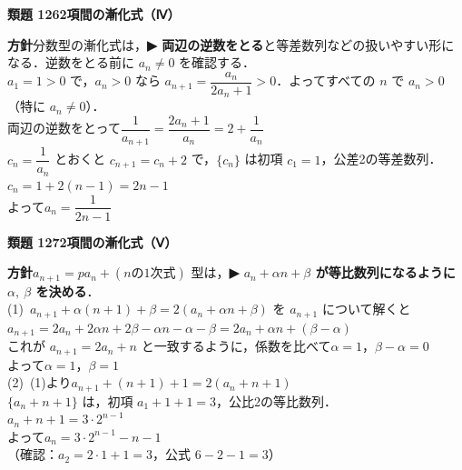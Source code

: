 \documentclass[a4paper,11pt]{ltjsarticle}
\newcommand{\ans}[2]{\Needspace{5\baselineskip}\vspace{6pt}%
  {\sffamily\bfseries 類題 #1\quad #2}\par}
\newcommand{\point}[1]{\textsf{\bfseries ▶ #1}}
\begin{document}
\ans{126}{2項間の漸化式（Ⅳ）}
\begin{kai}
\textbf{方針}\quad 分数型の漸化式は，\point{両辺の逆数をとる}と等差数列などの扱いやすい形になる．逆数をとる前に $a_n\neq0$ を確認する．\\[2pt]
$a_1=1>0$ で，$a_n>0$ なら $a_{n+1}=\dfrac{a_n}{2a_n+1}>0$．よってすべての $n$ で $a_n>0$（特に $a_n\neq0$）．\\[2pt]
両辺の逆数をとって\quad $\dfrac1{a_{n+1}}=\dfrac{2a_n+1}{a_n}=2+\dfrac1{a_n}$\\
$c_n=\dfrac1{a_n}$ とおくと $c_{n+1}=c_n+2$ で，$\{c_n\}$ は初項 $c_1=1$，公差2の等差数列．\\
\hspace*{1.5em}$c_n=1+2(n-1)=2n-1$\\[2pt]
よって\quad $a_n=\dfrac1{2n-1}$
\end{kai}

\ans{127}{2項間の漸化式（Ⅴ）}
\begin{kai}
\textbf{方針}\quad $a_{n+1}=pa_n+(n\text{の1次式})$ 型は，\point{$a_n+\alpha n+\beta$ が等比数列になるように $\alpha,\ \beta$ を決める}．\\[2pt]
(1)\ $a_{n+1}+\alpha(n+1)+\beta=2(a_n+\alpha n+\beta)$ を $a_{n+1}$ について解くと\\
\hspace*{1.5em}$a_{n+1}=2a_n+2\alpha n+2\beta-\alpha n-\alpha-\beta=2a_n+\alpha n+(\beta-\alpha)$\\
\hspace*{1.5em}これが $a_{n+1}=2a_n+n$ と一致するように，係数を比べて\quad $\alpha=1$，\quad $\beta-\alpha=0$\\
\hspace*{1.5em}よって\quad $\alpha=1$，$\beta=1$\\[2pt]
(2)\ (1)より\quad $a_{n+1}+(n+1)+1=2(a_n+n+1)$\\
\hspace*{1.5em}$\{a_n+n+1\}$ は，初項 $a_1+1+1=3$，公比2の等比数列．\\
\hspace*{1.5em}$a_n+n+1=3\cdot2^{n-1}$\\
\hspace*{1.5em}よって\quad $a_n=3\cdot2^{n-1}-n-1$\\
\hspace*{1.5em}（確認：$a_2=2\cdot1+1=3$，公式 $6-2-1=3$）
\end{kai}
\end{document}
